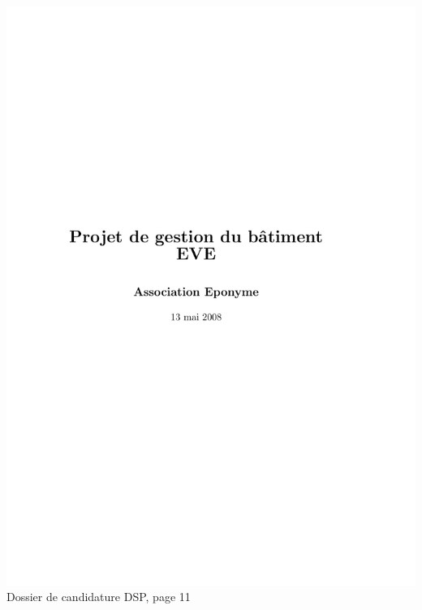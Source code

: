 \includegraphics[scale=0.85,trim=20mm 20mm 20mm 20mm,clip,page=11]{annexes/candidature_dsp.pdf} \\
Dossier de candidature DSP, page 11
\newpage
